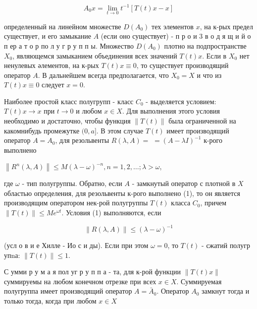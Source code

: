 \documentclass[10pt]{article}
\begin{document}
\[

A_{0} x=\lim _{t \rightarrow 0} t^{-1}[T(t) x-x]

\]



определенный на линейном множестве $D\left(A_{0}\right)$ тех элементов $x$, на к-рых предел существует, и его замыкание $A$ (если оно существует) - п р о и 3 в о д я щ и й о п ер а т о р по л у г р у п п ы. Множество $D\left(A_{0}\right)$ плотно на подпространстве $X_{0}$, являющемся замыканием объединения всех значений $T(t) x$. Если в $X_{0}$ нет ненулевых әлементов, на к-рых $T(t) x \equiv 0$, то существует производящий оператор $A$. В дальнейшем всегда предполагается, что $X_{0}=X$ и что из $T(t) x \equiv 0$ следует $x=0$.



Наиболее простой класс полугрупп - класс $C_{0}$ - выделяется условием: $T(t) x \rightarrow x$ при $t \rightarrow 0$ и любом $x \in X$. Для выполнения этого условия необходимо и достаточно, чтобы функция $\|T(t)\|$ была ограниченной на какомнибудь промежутке $(0, a]$. В этом случае $T(t)$ имеет производящий оператор $A=A_{0}$, для резольвенты $R(\lambda, A)=$ $=(A-\lambda I)^{-1}$ к-рого выполнено



$\left\|R^{n}(\lambda, A)\right\| \leqslant M(\lambda-\omega)^{-n}, n=1,2, \ldots ; \lambda>\omega$,



где $\omega$ - тип полугруппы. Обратно, если $A$ - замкнутый оператор с плотной в $X$ областью определения, для резольвенты к-рого выполнено (1), то он является производящим оператором нек-рой полугруппы $T(t)$ класса $C_{0}$, причем $\|T(t)\| \leqslant M e^{\omega t}$. Условия (1) выполняются, если



\[

\|R(\lambda, A)\| \leqslant(\lambda-\omega)^{-1}

\]



(усл о в и е Хилле - Ио с и ды). Если при этом $\omega=0$, то $T(t)$ - сжатий полугр упnа: $\|T(t)\| \leqslant 1$.



С умми р у м а я пол уг р у п п а - та, для к-рой функции $\|T(t) x\|$ суммируемы на любом конечном отрезке при всех $x \in X$. Суммируемая полугруппа имеет производящий оператор $A=\bar{A}_{0}$. Оператор $A_{0}$ замкнут тогда и только тогда, когда при любом $x \in X$
\end{document}
